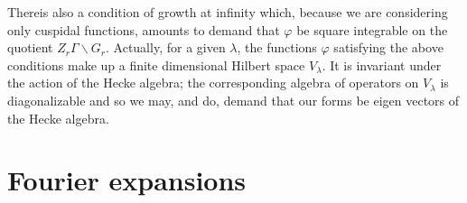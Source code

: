 There\pageoriginale is also a condition of growth at infinity which, because we are considering only cuspidal functions, amounts to demand that $\varphi$ be square integrable on the quotient $Z_{r}\Gamma\backslash G_{r}$. Actually, for a given $\lambda$, the functions $\varphi$ satisfying the above conditions make up a finite dimensional Hilbert space $V_{\lambda}$. It is invariant under the action of the Hecke algebra; the corresponding algebra of operators on $V_{\lambda}$ is diagonalizable and so we may, and do, demand that our forms be eigen vectors of the Hecke algebra.

\section{Fourier expansions}\label{art5-eq3}

